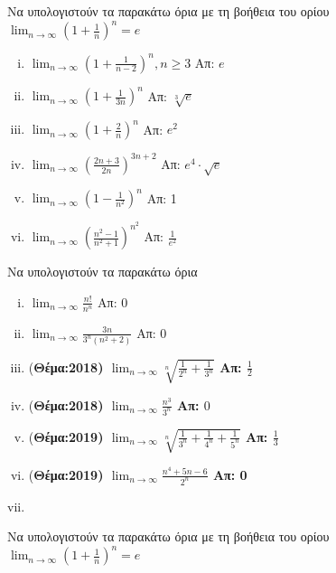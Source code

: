 
  \item Να υπολογιστούν τα παρακάτω όρια με τη βοήθεια του ορίου 
    $ \lim_{n \to \infty} \left(1+ \frac{1}{n}\right)^{n}=e $

    \begin{enumerate}[i)]
      \item $ \lim_{n \to \infty} \left(1+ \frac{1}{n-2}\right)^{n}, 
        n \geq 3 $ 
        \hfill Απ: $e$  
      \item $ \lim_{n \to \infty} \left(1 + \frac{1}{3n}\right)^{n} $ 
        \hfill Απ: $ \sqrt[3]{e} $ 
      \item $ \lim_{n \to \infty} \left(1+ \frac{2}{n}\right)^{n} $ 
        \hfill Απ: $ e^{2} $ 
      \item $ \lim_{n \to \infty} \left(\frac{2n +3}{2n} \right)^{3n+2}  $
        \hfill Απ: $ e^{4}\cdot \sqrt{e} $ 
      \item $ \lim_{n \to \infty}\left(1-\frac{1}{n^{2}} \right)^{n} $ 
        \hfill Απ: 1 
      \item $ \lim_{n \to \infty} \left(\frac{n^{2}-1}{n^{2}+1} \right)^{n^{2}} $
        \hfill Απ: $ \frac{1}{e^{2}} $ 
    \end{enumerate}

  \item Να υπολογιστούν τα παρακάτω όρια 

    \begin{enumerate}[i)]
  \item $ \lim_{n \to \infty} \frac{n!}{n^{n}} $ \hfill Απ: 0  
  \item $ \lim_{n \to \infty} \frac{3n}{3^{n}(n^{2}+2)} $ \hfill Απ: 0  
  \item (\bfseries Θέμα:2018) $ \lim_{n \to \infty} \sqrt[n]{\frac{1}{2^{n}}+ 
    \frac{1}{3^{n}}} $ \hfill Απ: $ \frac{1}{2} $ 
  \item (\bfseries Θέμα:2018) $ \lim_{n \to \infty} \frac{n^{3}}{3^{n}} $ 
    \hfill Απ: $ 0 $
  \item (\bfseries Θέμα:2019) $ \lim_{n \to \infty} \sqrt[n]{\frac{1}{3^{n}} + 
    \frac{1}{4^{n}} + \frac{1}{5^{n}}} $ \hfill Απ: $ \frac{1}{3} $
  \item (\bfseries Θέμα:2019) $ \lim_{n \to \infty} \frac{n^{4}+5n-6}{2^{n}} $ 
    \hfill Απ: 0 
      \item 
    \end{enumerate}


  \item Να υπολογιστούν τα παρακάτω όρια με τη βοήθεια του ορίου
    $ \lim_{n \to \infty} \left(1+ \frac{1}{n} \right)^{n} = e $ 

